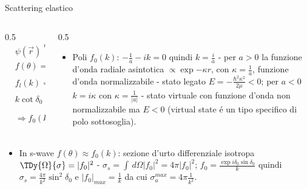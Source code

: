 \begin{frame}{Scattering elastico}
    \begin{columns}[T]
        \begin{column}{0.5\textwidth}
            \begin{align*}
                &\psi(\vec{r})\xrightarrow{r\to\infty}\exp{ikz}+f(\theta)\frac{\exp{ikr}}{r}=\psi_{inc}+\psi_{sc}\tag{sc wf asint}\\
                &f(\theta)=\sum_{l=0}(2l+1)f_l(k)P_l(\cos{\theta})\tag{sviluppo onde parziali}\\
                &f_l(k)=\frac{\exp{2i\delta_l}-1}{2ik}=\frac{\exp{i\delta_l}\sin{\delta_l}}{k}=\frac{1}{k\cot{\delta_l}-ik}\\
                &k\cot{\delta_0(k)}=-\frac{1}{a_s}+\frac{1}{2}r_ek^2+\ldots\tag{effective range expansion}\\
                &\Rightarrow f_0(k)\approx \frac{1}{-\frac{1}{a_s}+\frac{1}{2}r_ek^2-ik}\xrightarrow{k\to0}-a_s
            \end{align*}
        \end{column}
        \begin{column}{0.5\textwidth}
            \begin{itemize}
                \item Poli $f_0(k)$: $-\frac{1}{a}-ik=0$ quindi $k=\frac{i}{a}$ - per $a>0$ la funzione d'onda radiale asintotica $\propto\exp{-\kappa r}$, con $\kappa=\frac{1}{a}$, funzione d'onda normalizzabile - stato legato $E=-\frac{\hbar^2\kappa^2}{2\mu}<0$; per $a<0$ $k=i\kappa$ con $\kappa=\frac{1}{|a|}$ - stato virtuale con funzione d'onda non normalizzabile ma $E<0$ (virtual state \'e un tipo specifico di polo sottosoglia).
            \end{itemize}
        \end{column}
    \end{columns}
    \begin{itemize}
        \item In s-wave $f(\theta)\approx f_0(k)$: sezione d'urto differenziale isotropa $\TDy{\Omega}{\sigma}=|f_0|^2$ - $\sigma_s=\int\,d\Omega|f_0|^2=4\pi|f_0|^2$; $f_0=\frac{\exp{i\delta_0}\sin{\delta_0}}{k}$ quindi $\sigma_s=\frac{4\pi}{k^2}\sin^2{\delta_0}$ e $|f_0|_{max}=\frac{1}{k}$ da cui $\sigma_a^{max}=4\pi \frac{1}{k^2}$.
    \end{itemize}
\end{frame}

